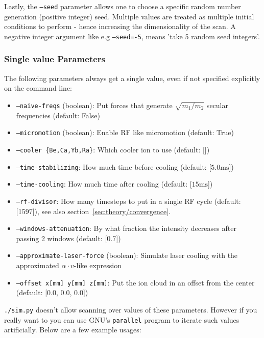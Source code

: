 Lastly, the \texttt{--seed} parameter allows one to choose a specific random number generation (positive integer) seed. Multiple values are treated as multiple initial conditions to perform - hence increasing the dimensionality of the scan. A negative integer argument like e.g \texttt{--seed=-5}, means 'take 5 random seed integers'.

\subsubsection{Single value Parameters}\label{sssec:manual/single-value-params}

The following parameters always get a single value, even if not specified explicitly on the command line:

\begin{itemize}%
    \item \texttt{--naive-freqs} (boolean): Put forces that generate $\sqrt{m_1/m_2}$ secular frequencies (default: False)
    \item \texttt{--micromotion} (boolean): Enable RF like micromotion (default: True)
    \item \texttt{--cooler \{Be,Ca,Yb,Ra\}}: Which cooler ion to use (default: [])
    \item \texttt{--time-stabilizing}: How much time before cooling (default: [$5.0 \mathrm{ms}$])
    \item \texttt{--time-cooling}: How much time after cooling (default: [$15 \mathrm{ms}$])
    \item \texttt{--rf-divisor}: How many timesteps to put in a single RF cycle (default: [1597]), see also section~\ref{sec:theory/convergence}.
    \item \texttt{--windows-attenuation}: By what fraction the intensity decreases after passing 2 windows (default: [0.7])
    \item \texttt{--approximate-laser-force} (boolean): Simulate laser cooling with the approximated $\alpha \cdot v$-like expression
    \item \texttt{--offset x[mm] y[mm] z[mm]}: Put the ion cloud in an offset from the center (default: [0.0, 0.0, 0.0])
\end{itemize}

\texttt{./sim.py} doesn't allow scanning over values of these parameters. However if you really want to you can use GNU's \texttt{parallel}\cite{GNUParallel} program to iterate such values artificially. Below are a few example usages:

